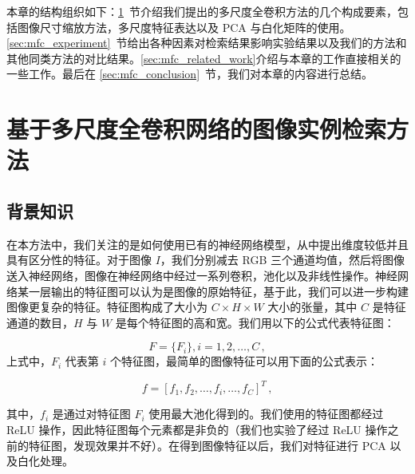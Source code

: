 本章的结构组织如下：\ref{sec:mfc_factor_explaination}~节介绍我们提出的多尺度全卷积方法的几个构成要素，包括图像尺寸缩放方法，多尺度特征表达以及 PCA 与白化矩阵的使用。\ref{sec:mfc_experiment}~节给出各种因素对检索结果影响实验结果以及我们的方法和其他同类方法的对比结果。\ref{sec:mfc_related_work}介绍与本章的工作直接相关的一些工作。最后在 \ref{sec:mfc_conclusion}~节，我们对本章的内容进行总结。

\section{基于多尺度全卷积网络的图像实例检索方法}\label{sec:mfc_factor_explaination}
\subsection{背景知识}
在本方法中，我们关注的是如何使用已有的神经网络模型，从中提出维度较低并且具有区分性的特征。对于图像 $I$，我们分别减去 RGB 三个通道均值，然后将图像送入神经网络，图像在神经网络中经过一系列卷积，池化以及非线性操作。神经网络某一层输出的特征图可以认为是图像的原始特征，基于此，我们可以进一步构建图像更复杂的特征。特征图构成了大小为 $C \times H \times  W$ 大小的张量，其中 $C$ 是特征通道的数目，$H$ 与 $W$ 是每个特征图的高和宽。我们用以下的公式代表特征图：

\begin{equation}
F=\{F_i\}, i=1,2,\ldots, C\, ,
\end{equation}
上式中，$F_i$ 代表第 $i$ 个特征图，最简单的图像特征可以用下面的公式表示：

\begin{equation}\label{eq:single_scale}
f = [f_1, f_2, \ldots, f_i, \ldots, f_C]^T\, ,
\end{equation}

其中，$f_i$ 是通过对特征图 $F_i$ 使用最大池化得到的。我们使用的特征图都经过 ReLU 操作，因此特征图每个元素都是非负的（我们也实验了经过 ReLU 操作之前的特征图，发现效果并不好）。在得到图像特征以后，我们对特征进行 PCA 以及白化处理。

